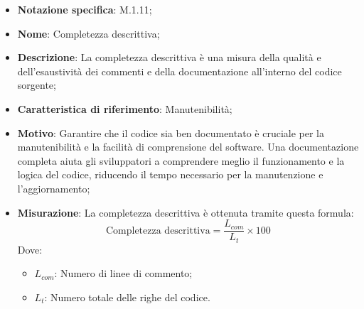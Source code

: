 \begin{itemize}
    \item \textbf{Notazione specifica}: M.1.11;
    \item \textbf{Nome}: Completezza descrittiva;
    \item \textbf{Descrizione}: La completezza descrittiva è una misura della qualità e dell'esaustività dei commenti e della documentazione all'interno del codice sorgente;
    \item \textbf{Caratteristica di riferimento}: Manutenibilità;
    \item \textbf{Motivo}: Garantire che il codice sia ben documentato è cruciale per la manutenibilità e la facilità di comprensione del software. Una documentazione completa aiuta gli sviluppatori a comprendere meglio il funzionamento e la logica del codice, riducendo il tempo necessario per la manutenzione e l'aggiornamento;
    \item \textbf{Misurazione}: La completezza descrittiva è ottenuta tramite questa formula:
    \[
    \text{Completezza descrittiva} = \frac{L_{com}}{L_{t}} \times 100
    \]
    Dove:
    \begin{itemize}
        \item $L_{com}$: Numero di linee di commento;
        \item $L_{t}$: Numero totale delle righe del codice.
    \end{itemize}
\end{itemize}
